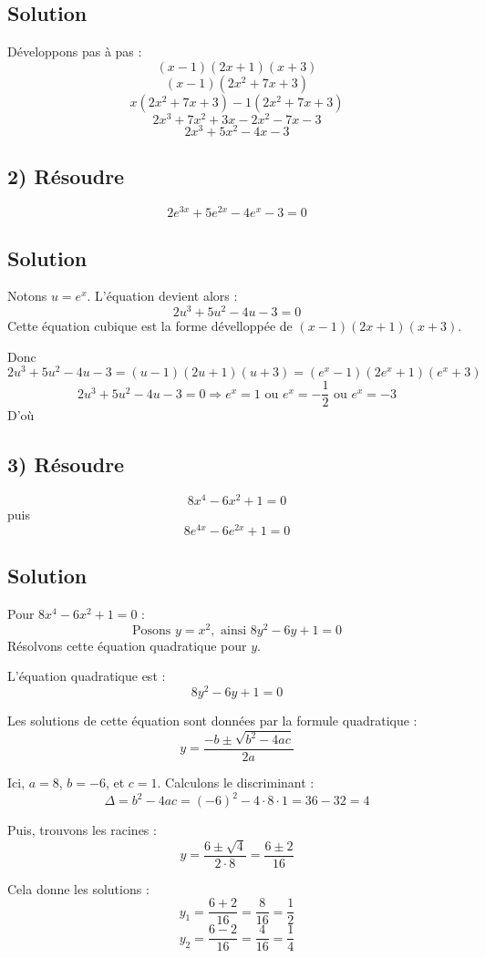 \documentclass[12pt]{article}
\begin{document}
\subsection*{Solution}
Développons pas à pas :
\[
(x-1)(2x+1)(x+3)
\]
\[
(x-1)(2x^2 + 7x + 3)
\]
\[
x(2x^2 + 7x + 3) - 1(2x^2 + 7x + 3)
\]
\[
2x^3 + 7x^2 + 3x - 2x^2 - 7x - 3
\]
\[
2x^3 + 5x^2 - 4x - 3
\]

\subsection*{2) Résoudre } 
\[
2e^{3x}+5e^{2x}-4e^{x}-3 = 0
\]

\subsection*{Solution}
Notons \( u = e^x \). L'équation devient alors :
\[
2u^3 + 5u^2 - 4u - 3 = 0
\]
Cette équation cubique est la forme dévelloppée de $(x-1)(2x+1)(x+3)$.

Donc $2u^3 + 5u^2 - 4u - 3=(u-1)(2u+1)(u+3)=(e^x-1)(2e^x+1)(e^x+3)$
\[
2u^3 + 5u^2 - 4u - 3 = 0 \Longrightarrow e^x=1 \text{ ou } e^x=-\frac{1}{2} \text{ ou } e^x=-3
\]
D'où \textcolor{green}{}
\subsection*{3) Résoudre} 
\[
8x^4 - 6x^2 + 1 = 0
\]
puis 
\[
8e^{4x} - 6e^{2x} + 1 = 0
\]

\subsection*{Solution}
Pour \(8x^4 - 6x^2 + 1 = 0\) :
\[
\text{Posons } y = x^2, \text{ ainsi } 8y^2 - 6y + 1 = 0
\]
Résolvons cette équation quadratique pour \(y\).

L'équation quadratique est :
\[
8y^2 - 6y + 1 = 0
\]

Les solutions de cette équation sont données par la formule quadratique :
\[
y = \frac{-b \pm \sqrt{b^2 - 4ac}}{2a}
\]

Ici, \(a = 8\), \(b = -6\), et \(c = 1\). Calculons le discriminant :
\[
\Delta = b^2 - 4ac = (-6)^2 - 4 \cdot 8 \cdot 1 = 36 - 32 = 4
\]

Puis, trouvons les racines :
\[
y = \frac{6 \pm \sqrt{4}}{2 \cdot 8} = \frac{6 \pm 2}{16}
\]

Cela donne les solutions :
\[
y_1 = \frac{6 + 2}{16} = \frac{8}{16} = \frac{1}{2}
\]
\[
y_2 = \frac{6 - 2}{16} = \frac{4}{16} = \frac{1}{4}
\]
\end{document}

